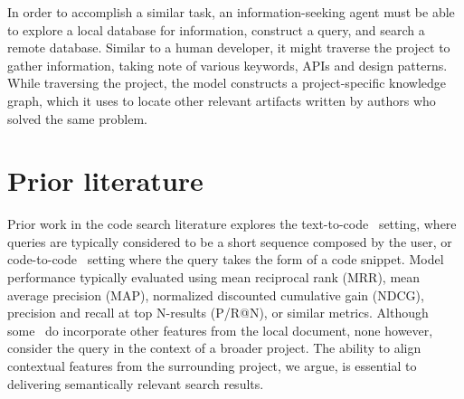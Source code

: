 \documentclass[sigconf]{acmart}
\begin{document}
  In order to accomplish a similar task, an information-seeking agent must be able to explore a local database for information, construct a query, and search a remote database. Similar to a human developer, it might traverse the project to gather information, taking note of various keywords, APIs and design patterns. While traversing the project, the model constructs a project-specific knowledge graph, which it uses to locate other relevant artifacts written by authors who solved the same problem.




  \section{Prior literature}\label{sec:prior-literature}

  Prior work in the code search literature explores the text-to-code~\citep{husain2019codesearchnet} setting, where queries are typically considered to be a short sequence composed by the user, or code-to-code~\citep{kim2018facoy} setting where the query takes the form of a code snippet. Model performance typically evaluated using mean reciprocal rank (MRR), mean average precision (MAP), normalized discounted cumulative gain (NDCG), precision and recall at top N-results (P/R@N), or similar metrics. Although some~\citep{asyrofi2020ausearch} do incorporate other features from the local document, none however, consider the query in the context of a broader project. The ability to align contextual features from the surrounding project, we argue, is essential to delivering semantically relevant search results.
\end{document}
